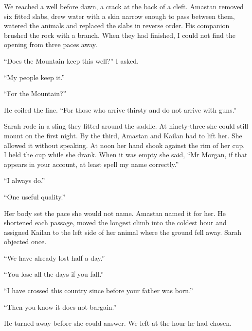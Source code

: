 We reached a well before dawn, a crack at the back of a cleft. Amastan removed six fitted slabs, drew water with a skin narrow enough to pass between them, watered the animals and replaced the slabs in reverse order. His companion brushed the rock with a branch. When they had finished, I could not find the opening from three paces away.\par

``Does the Mountain keep this well?'' I asked.\par

``My people keep it.''\par

``For the Mountain?''\par

He coiled the line. ``For those who arrive thirsty and do not arrive with guns.''\par

Sarah rode in a sling they fitted around the saddle. At ninety-three she could still mount on the first night. By the third, Amastan and Kailan had to lift her. She allowed it without speaking. At noon her hand shook against the rim of her cup. I held the cup while she drank. When it was empty she said, ``Mr Morgan, if that appears in your account, at least spell my name correctly.''\par

``I always do.''\par

``One useful quality.''\par

Her body set the pace she would not name. Amastan named it for her. He shortened each passage, moved the longest climb into the coldest hour and assigned Kailan to the left side of her animal where the ground fell away. Sarah objected once.\par

``We have already lost half a day.''\par

``You lose all the days if you fall.''\par

``I have crossed this country since before your father was born.''\par

``Then you know it does not bargain.''\par

He turned away before she could answer. We left at the hour he had chosen.\par

